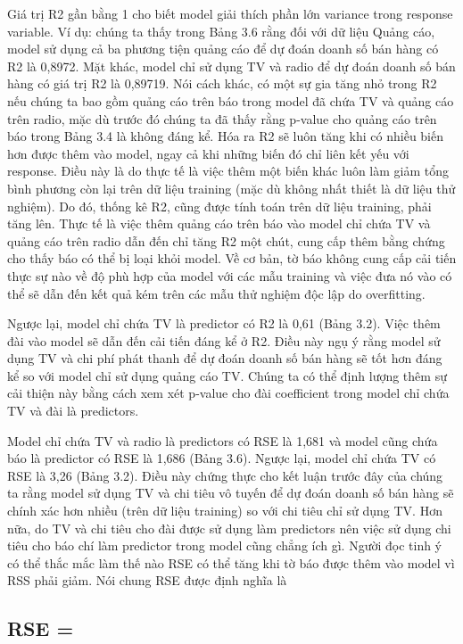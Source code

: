 Giá trị R2 gần bằng 1 cho biết model giải thích phần lớn variance trong response variable. Ví dụ: chúng ta thấy trong Bảng 3.6 rằng đối với dữ liệu Quảng cáo, model sử dụng cả ba phương tiện quảng cáo để dự đoán doanh số bán hàng có R2 là 0,8972. Mặt khác, model chỉ sử dụng TV và radio để dự đoán doanh số bán hàng có giá trị R2 là 0,89719. Nói cách khác, có một sự gia tăng nhỏ trong R2 nếu chúng ta bao gồm quảng cáo trên báo trong model đã chứa TV và quảng cáo trên radio, mặc dù trước đó chúng ta đã thấy rằng p-value cho quảng cáo trên báo trong Bảng 3.4 là không đáng kể. Hóa ra R2 sẽ luôn tăng khi có nhiều biến hơn được thêm vào model, ngay cả khi những biến đó chỉ liên kết yếu với response. Điều này là do thực tế là việc thêm một biến khác luôn làm giảm tổng bình phương còn lại trên dữ liệu training (mặc dù không nhất thiết là dữ liệu thử nghiệm). Do đó, thống kê R2, cũng được tính toán trên dữ liệu training, phải tăng lên. Thực tế là việc thêm quảng cáo trên báo vào model chỉ chứa TV và quảng cáo trên radio dẫn đến chỉ tăng R2 một chút, cung cấp thêm bằng chứng cho thấy báo có thể bị loại khỏi model. Về cơ bản, tờ báo không cung cấp cải tiến thực sự nào về độ phù hợp của model với các mẫu training và việc đưa nó vào có thể sẽ dẫn đến kết quả kém trên các mẫu thử nghiệm độc lập do overfitting.

Ngược lại, model chỉ chứa TV là predictor có R2 là 0,61 (Bảng 3.2). Việc thêm đài vào model sẽ dẫn đến cải tiến đáng kể ở R2. Điều này ngụ ý rằng model sử dụng TV và chi phí phát thanh để dự đoán doanh số bán hàng sẽ tốt hơn đáng kể so với model chỉ sử dụng quảng cáo TV. Chúng ta có thể định lượng thêm sự cải thiện này bằng cách xem xét p-value cho đài coefficient trong model chỉ chứa TV và đài là predictors.

Model chỉ chứa TV và radio là predictors có RSE là 1,681 và model cũng chứa báo là predictor có RSE là 1,686 (Bảng 3.6). Ngược lại, model chỉ chứa TV có RSE là 3,26 (Bảng 3.2). Điều này chứng thực cho kết luận trước đây của chúng ta rằng model sử dụng TV và chi tiêu vô tuyến để dự đoán doanh số bán hàng sẽ chính xác hơn nhiều (trên dữ liệu training) so với chi tiêu chỉ sử dụng TV. Hơn nữa, do TV và chi tiêu cho đài được sử dụng làm predictors nên việc sử dụng chi tiêu cho báo chí làm predictor trong model cũng chẳng ích gì. Người đọc tinh ý có thể thắc mắc làm thế nào RSE có thể tăng khi tờ báo được thêm vào model vì RSS phải giảm. Nói chung RSE được định nghĩa là

\subsection{RSE =}


